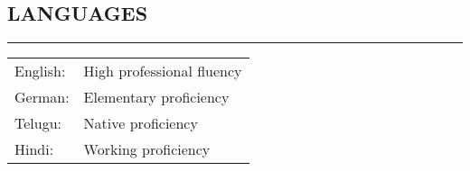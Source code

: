 {\begin{minipage}[t][\textheight-2\fboxsep-2\fboxrule][t]{0.28\textwidth}
\begin{flushleft}
\section*{LANGUAGES} \vskip -3.5mm {\color{cyan}\hrule} \vskip 3.5mm

\begin{tabular}{l l}
	English:& High professional fluency\\
	German:	& Elementary proficiency \\
	Telugu:	& Native proficiency  \\
	Hindi: & Working proficiency \\
\end{tabular}
		\end{flushleft}
\end{minipage}}

